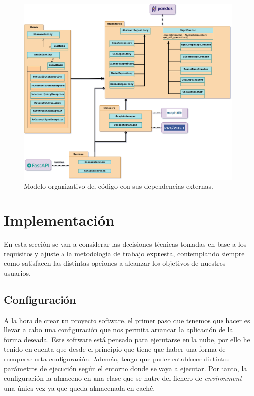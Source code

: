 \begin{figure}[h]
	\centering	
	\includegraphics[width=\textwidth]{doc/logos/imgs/arquitectonico.png}
	\caption{ Modelo organizativo del código con sus dependencias externas. }
    \label{fig:worst_f_value}
\end{figure}



\section{Implementación}
En esta sección se van a considerar las decisiones técnicas tomadas en base a los
requisitos y ajuste a la metodología de trabajo expuesta, contemplando siempre como
satisfacen las distintas opciones a alcanzar los objetivos de nuestros usuarios.

\subsection{Configuración}
A la hora de crear un proyecto software, el primer paso que tenemos que hacer es llevar a
cabo una configuración que nos permita arrancar la aplicación de la forma deseada. Este
software está pensado para ejecutarse en la nube, por ello he tenido en cuenta que desde
el principio que tiene que haber una forma de recuperar esta configuración. Además, tengo
que poder establecer distintos parámetros de ejecución según el entorno donde se vaya a
ejecutar. Por tanto, la configuración la almaceno en una clase que se nutre del fichero de
\textit{environment} una única vez ya que queda almacenada en caché. 

